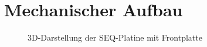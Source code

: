 \section{Mechanischer Aufbau}
\begin{figure}[h]
	\centering
	\setlength{\fboxsep}{1pt} %
	\setlength{\fboxrule}{1pt} %
	\caption{3D-Darstellung der SEQ-Platine mit Frontplatte}
	\label{fig:Frontplatte_SEQ}
\end{figure}
\FloatBarrier
